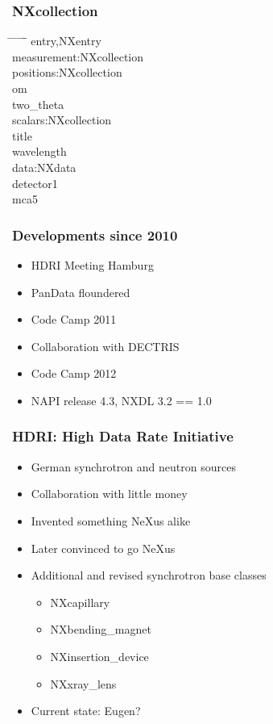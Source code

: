\documentclass{beamer}
\begin{document}
\begin{frame} \frametitle{NXcollection}
\begin{tabbing}
\hspace*{1cm} \= \hspace*{1cm} \= \hspace*{1cm} \= \hspace*{1cm} \= \hspace*{1cm} \= \hspace*{1cm}\= \kill
\>entry,NXentry\\
\> \>measurement:NXcollection\\
\> \> \>positions:NXcollection\\
\> \> \> \>om \\
\> \> \> \>two\_theta\\
\> \> \>scalars:NXcollection\\
\> \> \> \>title\\
\> \> \> \>wavelength\\
\> \> \>data:NXdata\\
\> \> \> \>detector1\\
\> \> \> \>mca5\\
\end{tabbing}
\end{frame}


\begin{frame}
\frametitle{Developments since 2010}
\begin{itemize}
\item HDRI Meeting Hamburg
\item PanData floundered
\item Code Camp 2011
\item Collaboration with DECTRIS
\item Code Camp 2012
\item NAPI release 4.3, NXDL 3.2 == 1.0
\end{itemize}
\end{frame}


\begin{frame}
\frametitle{HDRI: High Data Rate Initiative}
\begin{itemize}
\item German synchrotron and neutron sources 
\item Collaboration with little money
\item Invented something NeXus alike
\item Later convinced to go NeXus
\item Additional and revised synchrotron base classes
\begin{itemize}
\item NXcapillary
\item NXbending\_magnet
\item NXinsertion\_device
\item NXxray\_lens
\end{itemize}
\item Current state: Eugen?
\end{itemize}
\end{frame}
\end{document}
